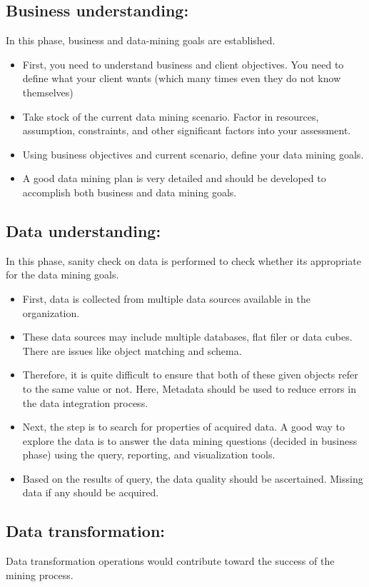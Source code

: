 \documentclass[a4paper,10pt]{article}
\begin{document}
\subsection{Business understanding:}
In this phase, business and data-mining goals are established.
\begin{itemize}
	\item First, you need to understand business and client objectives. You need to define what your client wants (which many times even they do not know themselves)
	\item Take stock of the current data mining scenario. Factor in resources, assumption, constraints, and other significant factors into your assessment.
	\item Using business objectives and current scenario, define your data mining goals.
	\item A good data mining plan is very detailed and should be developed to accomplish both business and data mining goals.
\end{itemize}

\subsection{Data understanding:}
In this phase, sanity check on data is performed to check whether its appropriate for the data mining goals.
\begin{itemize}
	\item First, data is collected from multiple data sources available in the organization.
	\item These data sources may include multiple databases, flat filer or data cubes. There are issues like object matching and schema.
	\item Therefore, it is quite difficult to ensure that both of these given objects refer to the same value or not. Here, Metadata should be used to reduce errors in the data integration process.
	\item Next, the step is to search for properties of acquired data. A good way to explore the data is to answer the data mining questions (decided in business phase) using the query, reporting, and visualization tools.
	\item Based on the results of query, the data quality should be ascertained. Missing data if any should be acquired.
\end{itemize}
\newpage
\subsection{Data transformation:}
Data transformation operations would contribute toward the success of the mining process.
\end{document}
